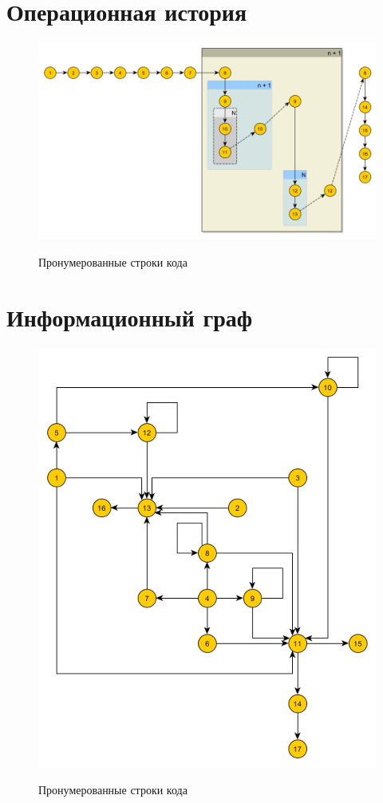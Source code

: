 \documentclass[12pt]{report}
\begin{document}
	\section{Операционная история}
	
		\begin{figure}[H]	
					\centering	
		{\includegraphics[scale=1.1]{img/oi.png}}
		\caption{Пронумерованные строки кода}
	\end{figure}

	\section{Информационный граф}
		\begin{figure}[H]	
					\centering	
		{\includegraphics[scale = 1]{img/ig.png}}
		\caption{Пронумерованные строки кода}
	\end{figure}
\end{document}
